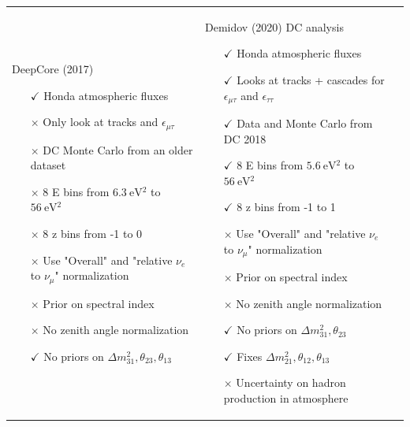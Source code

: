 \documentclass[draft=True]{revtex4-2}
\newcommand{\emt}{\ensuremath{\epsilon_{\mu\tau}}}
\newcommand{\ett}{\ensuremath{\epsilon_{\tau\tau}}}
\renewcommand{\ne}{\nu_e}
\newcommand{\nm}{\nu_\mu}
\newcommand{\dm}{\Delta m^2_{31}}
\begin{document}

\newpage
\begin{tabular}{p{55mm}p{55mm}p{55mm}}
   DeepCore (2017)
      \begin{itemize}
         \item[$\checkmark$] Honda atmospheric fluxes
         \item[$\times$] Only look at tracks and $\emt$
         \vspace{1em}  
         \item[$\times$] DC Monte Carlo from an older dataset 
         \item[$\times$] 8 E bins from $\SI{6.3}{\electronvolt^2}$ to $\SI{56}{\electronvolt^2}$
         \item[$\times$] 8 z bins from -1 to 0 
         \item[$\times$] Use "Overall" and "relative $\ne$ to $\nm$" normalization
         \item[$\times$] Prior on spectral index
         \item[$\times$] No zenith angle normalization
         \item[$\checkmark$] No priors on $\dm, \theta_{23},\theta_{13}$
      \end{itemize} &
    Demidov (2020) DC analysis
      \begin{itemize}
         \item[$\checkmark$] Honda atmospheric fluxes
         \item[$\checkmark$] Looks at tracks + cascades for $\emt$ and $\ett$
         \item[$\checkmark$] Data and Monte Carlo from DC 2018
         \item[$\checkmark$] 8 E bins from $\SI{5.6}{\electronvolt^2}   $ to $\SI{56}{\electronvolt^2}$
         \item[$\checkmark$] 8 z bins from -1 to 1
         \item[$\times$] Use "Overall" and "relative $\ne$ to $\nm$" normalization
         \item[$\times$] Prior on spectral index
         \item[$\times$] No zenith angle normalization
         \item[$\checkmark$] No priors on $\dm, \theta_{23}$
         \item[$\checkmark$] Fixes $\Delta m^2_{21}, \theta_{12}, \theta_{13}$
         \item[$\times$] Uncertainty on hadron production in atmosphere

\end{itemize}
\end{tabular}
\end{document}
